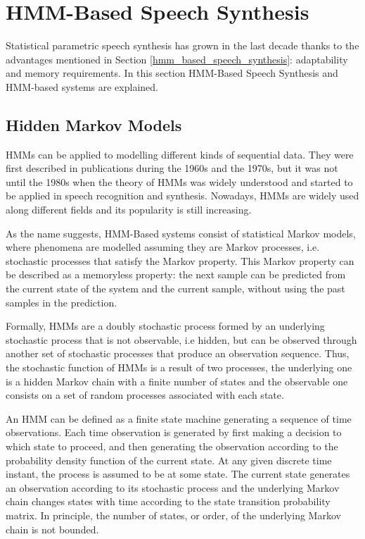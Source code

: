\section{HMM-Based Speech Synthesis}
\label{hmm_synthesis}
Statistical parametric speech synthesis has grown in the last decade thanks to the advantages mentioned in Section \ref{hmm_based_speech_synthesis}: adaptability and memory requirements. In this section HMM-Based Speech Synthesis and HMM-based systems are explained.

\subsection{Hidden Markov Models}
\label{hmm_syntheis_markov}
HMMs can be applied to modelling different kinds of sequential data.
%
They were first described in publications during the 1960s and the 1970s, but it was not until the 1980s when the theory of HMMs was widely understood and started to be applied in speech recognition and synthesis.
%
Nowadays, HMMs are widely used along different fields and its popularity is still increasing.

As the name suggests, HMM-Based systems consist of statistical Markov models, where phenomena are modelled assuming they are Markov processes, i.e. stochastic processes that satisfy the Markov property.
%
This Markov property can be described as a memoryless property: the next sample can be predicted from the current state of the system and the current sample, without using the past samples in the prediction.

Formally, HMMs are a doubly stochastic process formed by an underlying stochastic process that is not observable, i.e hidden, but can be observed through another set of stochastic processes that produce an observation sequence. 
%
Thus, the stochastic function of HMMs is a result of two processes, the underlying one is a hidden Markov chain with a finite number of states and the observable one consists on a set of random processes associated with each state.

An HMM can be defined as a finite state machine generating a sequence of time observations.
%
Each time observation is generated by first making a decision to which state to proceed, and then generating the observation according to the probability density function of the current state.
%
At any given discrete time instant, the process is assumed to be at some state.
%
The current state generates an observation according to its stochastic process and the underlying Markov chain changes states with time according to the state transition probability matrix. 
%
In principle, the number of states, or order, of the underlying Markov chain is not bounded.

